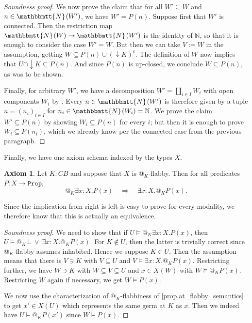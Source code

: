 \documentclass[11pt, oneside, article]{memoir}
\makeatletter
\theoremstyle{plain}
\theoremstyle{definition}
\newtheorem{axiom}{Axiom}
\theoremstyle{remark}
\newenvironment{soundproof}{\begin{proof}[Soundness proof]}{\end{proof}}
\newcommand{\const}[1]{\mathtt{#1}}
\newcommand{\internal}[1]{\raisebox{-.03ex}{$\mathbbmtt{#1}$}}
\newcommand{\hs}{\hspace{1.1pt}}
\newcommand{\NN}{\mathbb{N}}
\newcommand{\tNN}{\internal{N}\hs}
\newcommand{\Prop}{\const{Prop}}
\newcommand{\BaseSpace}{B}
\newcommand{\CB}{C\BaseSpace}
\newcommand{\AtSymbol}{{@}}
\newcommand{\At}[2][]{\AtSymbol^{#1}_{#2}}
\makeatother
\begin{document}
\begin{soundproof}
	We now prove the claim that for all $W' \subseteq W$ and $n \in \tNN(W')$, we have $W' = P(n)$. Suppose first that $W'$ is connected. Then the restriction map $\tNN(W) \to \tNN(W')$ is the identity of $\NN$, so that it is enough to consider the case $W' = W$. But then we can take $V := W$ in the assumption, getting $W \subseteq P(n) \cup (\downarrow K)^c$. The definition of $W$ now implies that $U \cap \downarrow K \subseteq P(n)$. And since $P(n)$ is up-closed, we conclude $W \subseteq P(n)$, as was to be shown.

	Finally, for arbitrary $W'$, we have a decomposition $W' = \coprod_{i\in I} W_i$ with open components $W_i$ by . Every $n \in \tNN(W')$ is therefore given by a tuple $n = (n_i)_{i\in I}$ for $n_i \in \tNN(W_i) = \NN$. We prove the claim $W' \subseteq P(n)$ by showing $W_i \subseteq P(n)$ for every $i$; but then it is enough to prove $W_i \subseteq P(n_i)$, which we already know per the connected case from the previous paragraph.
\end{soundproof}

Finally, we have one axiom schema indexed by the types $X$.

\begin{axiom}
	\label{ax:flabby_vs_at}
	Let $K : \CB$ and suppose that $X$ is $\At{K}$-flabby. Then for all predicates $P : X \to \Prop$,
	\[
		\At{K}\exists x:X. P(x) \quad \Longrightarrow \quad \exists x:X.\At{K}P(x).
	\]
\end{axiom}

Since the implication from right is left is easy to prove for every modality, we therefore know that this is actually an equivalence.

\begin{soundproof}
	We need to show that if $U \models \At{K} \exists x:X.P(x)$, then $U \models \At{K}\bot \:\lor\: \exists x:X.\At{K}P(x)$. For $K\not\in U$, then the latter is trivially correct since $\At{K}$-flabby assumes inhabited. Hence we suppose $K \in U$. Then the assumption means that there is $V\ni K$ with $V\subseteq U$ and $V\models \exists x:X.\At{K} P(x)$. Restricting further, we have $W\ni K$ with $W\subseteq V\subseteq U$ and $x\in X(W)$ with $W \models \At{K} P(x)$. Restricting $W$ again if necessary, we get $W \models P(x)$.

	We now use the characterization of $\At{K}$-flabbiness of \cref{prop.at_flabby_semantics} to get $x'\in X(U)$ which represents the same germ at $K$ as $x$. Then we indeed have $U\models \At{K} P(x')$ since $W\models P(x)$.
\end{soundproof}
\end{document}
